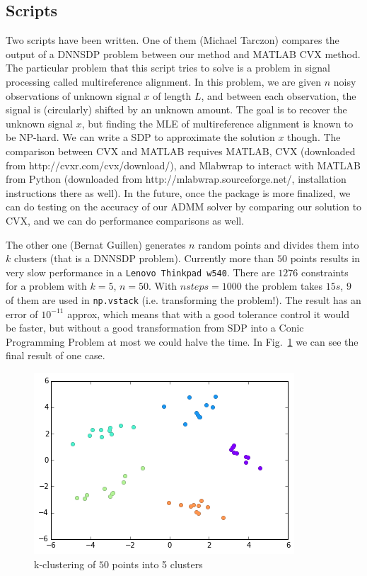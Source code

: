 \documentclass[paper=a4, fontsize=11pt]{scrartcl}
\numberwithin{equation}{section}		%
\numberwithin{figure}{section}			%
\numberwithin{table}{section}				%
\begin{document}
\subsection{Scripts}
Two scripts have been written. One of them (Michael Tarczon) compares the output of a DNNSDP problem between our method and MATLAB CVX method.  The particular problem that this script tries to solve is a problem in signal processing called multireference alignment.  In this problem, we are given $n$ noisy observations of unknown signal $x$ of length $L$, and between each observation, the signal is (circularly) shifted by an unknown amount. The goal is to recover the unknown signal $x$, but finding the MLE of multireference alignment is known to be NP-hard.  We can write a SDP to approximate the solution $x$ though.  The comparison between CVX and MATLAB requives MATLAB, CVX (downloaded from http://cvxr.com/cvx/download/), and Mlabwrap to interact with MATLAB from Python (downloaded from http://mlabwrap.sourceforge.net/, installation instructions there as well). In the future, once the package is more finalized, we can do testing on the accuracy of our ADMM solver by comparing our solution to CVX, and we can do performance comparisons as well.

The other one (Bernat Guillen) generates $n$ random points and divides them into $k$ clusters (that is a DNNSDP problem). Currently more than $50$ points results in very slow performance in a \texttt{Lenovo Thinkpad w540}. There are $1276$ constraints for a problem with $k=5$, $n=50$. With $nsteps = 1000$ the problem takes $15 s$, $9$ of them are used in \texttt{np.vstack} (i.e. transforming the problem!). The result has an error of $10^{-11}$ approx, which means that with a good tolerance control it would be faster, but without a good transformation from SDP into a Conic Programming Problem at most we could halve the time. In Fig.~\ref{fig:kclust} we can see the final result of one case.
\begin{figure}[h]
\label{fig:kclust}
\centering
\includegraphics[scale=0.7]{images/kclustering.png} 
\caption{k-clustering of $50$ points into 5 clusters}

\end{figure}
\end{document}
